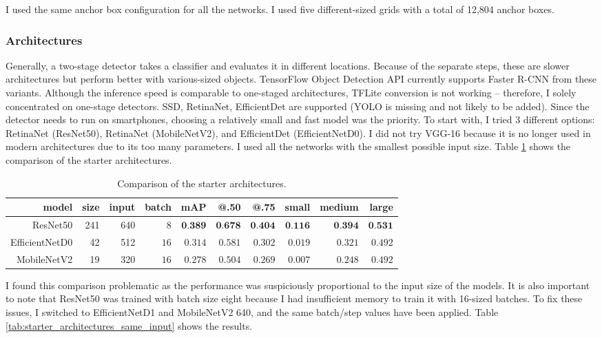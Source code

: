 I used the same anchor box configuration for all the networks. I used five different-sized grids with a total of 12,804 anchor boxes.

\subsubsection{Architectures}

Generally, a two-stage detector takes a classifier and evaluates it in different locations. Because of the separate steps, these are slower architectures but perform better with various-sized objects. TensorFlow Object Detection API currently supports Faster R-CNN from these variants. Although the inference speed is comparable to one-staged architectures, TFLite conversion is not working – therefore, I solely concentrated on one-stage detectors. SSD, RetinaNet, EfficientDet are supported (YOLO is missing and not likely to be added). Since the detector needs to run on smartphones, choosing a relatively small and fast model was the priority. To start with, I tried 3 different options: RetinaNet (ResNet50), RetinaNet (MobileNetV2), and EfficientDet (EfficientNetD0). I did not try VGG-16 because it is no longer used in modern architectures due to its too many parameters. I used all the networks with the smallest possible input size. Table \ref{tab:starter_architectures} shows the comparison of the starter architectures.

\begin{table}[htb]
\caption{Comparison of the starter architectures.}
\label{tab:starter_architectures}
\noindent
\centering
\begin{tabular*}
{\columnwidth}{@{\extracolsep{\stretch{1}}}*{10}{r}@{}}
    model & size & input & batch & mAP & @.50 & @.75 & small & medium & large\\ \hline
    ResNet50 & 241 & 640 & $8$ & $\textbf{0.389}$ & $\textbf{0.678}$ & $\textbf{0.404}$ & $\textbf{0.116}$ & $\textbf{0.394}$ & $\textbf{0.531}$\\
    EfficientNetD0 & 42 & 512 & $16$ & $0.314$ & $0.581$ & $0.302$ & $0.019$ & $0.321$ & $0.492$\\
    MobileNetV2 & 19 & 320 & $16$ & $0.278$ & $0.504$ & $0.269$ & $0.007$ & $0.248$ & $0.492$\\
\end{tabular*}
\end{table}

I found this comparison problematic as the performance was suspiciously proportional to the input size of the models. It is also important to note that ResNet50 was trained with batch size eight because I had insufficient memory to train it with 16-sized batches. To fix these issues, I switched to EfficientNetD1 and MobileNetV2 640, and the same batch/step values have been applied. Table \ref{tab:starter_architectures_same_input} shows the results.

